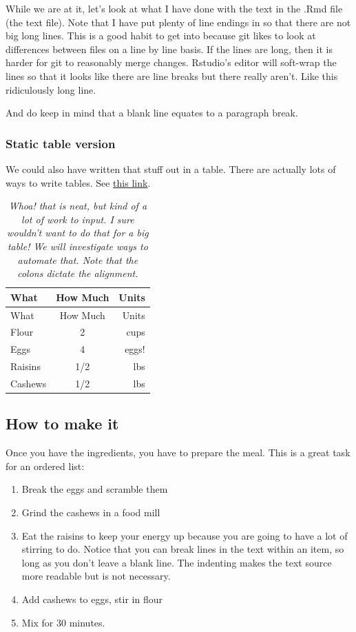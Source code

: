 \documentclass[
]{article}
\providecommand{\tightlist}{%
  \setlength{\itemsep}{0pt}\setlength{\parskip}{0pt}}
\begin{document}
While we are at it, let's look at what I have done with the text in the
.Rmd file (the text file). Note that I have put plenty of line endings
in so that there are not big long lines. This is a good habit to get
into because git likes to look at differences between files on a line by
line basis. If the lines are long, then it is harder for git to
reasonably merge changes. Rstudio's editor will soft-wrap the lines so
that it looks like there are line breaks but there really aren't. Like
this ridiculously long line.

And do keep in mind that a blank line equates to a paragraph break.

\hypertarget{static-table-list}{%
\subsubsection{Static table version}\label{static-table-list}}

We could also have written that stuff out in a table. There are actually
lots of ways to write tables. See
\href{http://rmarkdown.rstudio.com/authoring_pandoc_markdown.html\#tables}{this
link}.

\begin{longtable}[]{@{}lcr@{}}
\caption{\emph{Whoa! that is neat, but kind of a lot of work to input. I
sure wouldn't want to do that for a big table! We will investigate ways
to automate that. Note that the colons dictate the
alignment.}}\tabularnewline
\toprule
What & How Much & Units \\
\midrule
\endfirsthead
\toprule
What & How Much & Units \\
\midrule
\endhead
Flour & 2 & cups \\
Eggs & 4 & eggs! \\
Raisins & 1/2 & lbs \\
Cashews & 1/2 & lbs \\
\bottomrule
\end{longtable}

\hypertarget{how-to-make-it}{%
\subsection{How to make it}\label{how-to-make-it}}

Once you have the ingredients, you have to prepare the meal. This is a
great task for an ordered list:

\begin{enumerate}
\def\labelenumi{\arabic{enumi}.}
\tightlist
\item
  Break the eggs and scramble them
\item
  Grind the cashews in a food mill
\item
  Eat the raisins to keep your energy up because you are going to have a
  lot of stirring to do. Notice that you can break lines in the text
  within an item, so long as you don't leave a blank line. The indenting
  makes the text source more readable but is not necessary.
\item
  Add cashews to eggs, stir in flour
\item
  Mix for 30 minutes.
\end{enumerate}
\end{document}
